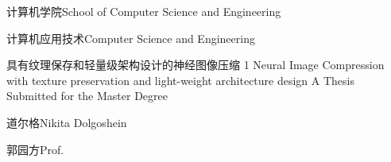 
\school
{计算机学院}{School of Computer Science and Engineering}

\major
{计算机应用技术}{Computer Science and Engineering}

\thesistitle
{具有纹理保存和轻量级架构设计的神经图像压缩}
{1}
{Neural Image Compression with texture preservation and light-weight architecture design}
{A Thesis Submitted for the Master Degree}

\thesisauthor
{道尔格}{Nikita Dolgoshein}

\teacher
{郭园方}{Prof.}






